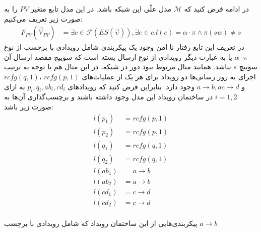 \documentclass[
msc,
irfonts
]{./tex/tehran-thesis}
\newcommand{\پ}{پروژه/پایان‌نامه/رساله }
\theoremstyle{definition}
\theoremstyle{theorem}
\theoremstyle{definition}
\numberwithin{algorithm}{chapter}
\newcommand{\s}[1]{\{#1\}}
\newcommand{\ra}{\rightarrow}
\newcommand{\crd}[4][above]{
    \node[draw,circle,inner sep=2pt,fill,label={[#1]:#4}] at (#2,#3) {};
}
\newcommand{\mc}[1]{\mathcal{#1}}
\newcommand{\f}[1]{F_{#1}(\vec V_{#1})}
\begin{document}
در ادامه فرض کنید که 
$\mc{M}$
مدل علّی این شبکه باشد.
در این مدل تابع متغیر
$PV$
را به صورت زیر تعریف می‌کنیم:
\begin{align*}
    \f{PV} & = \exists c \in \mathcal{F}(ES(\vec v)),
    \exists e \in c. l(e) =  \alpha\cdot\pi \wedge \pi(sw) \neq s
\end{align*}
در تعریف این تابع رفتار نا امن وجود یک پیکربندی شامل رویدادی با برچسب از نوع 
$\alpha \cdot \pi$
یا به عبارت دیگر رویدادی از نوع ارسال بسته است که سوییچ مقصد ارسال آن سوییچ 
$s$
نباشد.
همانند مثال مربوط نبود دور در شبکه، در این مثال هم با توجه به ترتیب اجرای به روز رسانی‌ها دو رویداد برای هر یک از عملیات‌های 
$rcfg(p,1)$
،$rcfg(q,1)$
و
$a\ra b,a c\ra d$
وجود دارد. 
بنابراین فرض کنید که رویدادهای
$p_i,q_i,ab_i,cd_i$
به ازای 
$i=1,2$
در ساختمان رویداد این مدل وجود داشته باشند و برچسب‌گذاری آن‌ها به صورت زیر باشد:
\begin{align*}
    l(p_1) & = rcfg(p,1) \\
    l(p_2) & = rcfg(p,1) \\
    l(q_1) & = rcfg(q,1) \\
    l(q_2) & = rcfg(q,1) \\
    l(ab_1) & = a \ra b \\
    l(ab_2) & = a \ra b \\
    l(cd_1) & = c \ra d \\
    l(cd_2) & = c \ra d \\
\end{align*}
\begin{figure}
    \centering
    \caption{}
    \label{fig:blackhole:es}
\end{figure}
پیکربندی‌هایی از این ساختمان رویداد که شامل رویدادی با برچسب 
$a \ra b$
\end{document}
